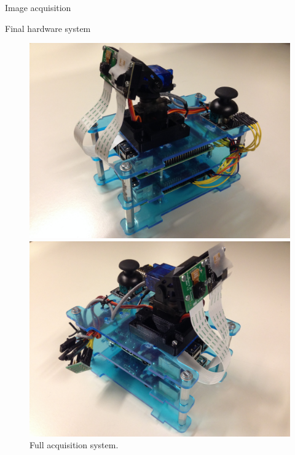 \documentclass[10pt]{article}
\begin{document}
\begin{section}{Image acquisition}
\begin{subsubsection}{Final hardware system}
        \medskip

        \begin{figure}[!h]
            \centering
            \begin{minipage}[b]{0.45\textwidth}
                \includegraphics[width=\textwidth]{fig/full_system.jpg}
            \end{minipage} \hspace{0.5em} %
            \begin{minipage}[b]{0.45\textwidth}
                \includegraphics[width=\textwidth]{fig/full_system2.jpg}
            \end{minipage}
            \caption{Full acquisition system.}
            \label{fig:full_system}
        \end{figure}
        

\end{subsubsection}
\end{section}
\end{document}
